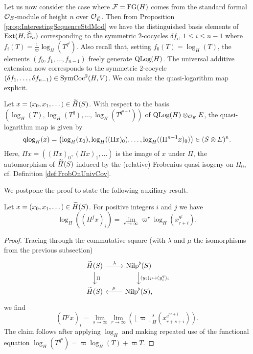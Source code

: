 \documentclass[../main.tex]{subfiles}
\begin{document}
Let us now consider the case where $\cF = \FGG(H)$ comes from the standard
formal $\cO_E$-module of height $n$ over $\cO_{\breve E}$. Then 
from Proposition \ref{prop:InterestingSequenceStdMod} we have the distinguished
basis elements of $\Ext(H,\Ghat_a)$ corresponding to the symmetric $2$-cocycles
$\delta f_i$, $1 \leq i \leq n-1$ where $f_i(T) = \frac 1 \varpi
\log_H(T^{q^i})$. Also recall that, setting $f_0(T) = \log_H(T)$, the elements 
$(f_0, f_1, \dots, f_{n-1})$ freely generate $\QLog(H)$. The universal
additive extension now corresponds to the symmetric $2$-cocycle $(\delta f_1,
\dots, \delta f_{n-1}) \in \SymCoc^2(H,V)$.
We can make the quasi-logarithm map explicit.

\begin{prop}\label{prop:qlogmapExplicit}
  Let $x = (x_0, x_1, \dots) \in \Tilde H(S)$. With respect to the basis
  $(\log_H(T),\allowbreak \log_H(T^q), \allowbreak \dots, \allowbreak \log_H(T^{q^{n-1}}))$ of 
  $\QLog(H) \otimes_{\cO_E} E$, the quasi-logarithm map is given by
  \begin{equation*}
    \qlog_H(x) = \left(\log_H(x_0), \log_H((\Pi x)_0), \dots, \log_H((\Pi^{n-1}
    x)_0)\right) \in (S\otimes E)^n.
  \end{equation*}
  Here, $\Pi x = ((\Pi x)_0, (\Pi x)_1, \dots)$ is the image of $x$ under
  $\Pi$, the automorphism of $\Tilde
  H(S)$ induced by the (relative) Frobenius quasi-isogeny on $H_0$, cf. Definition
  \ref{def:FrobOnUnivCov}.
\end{prop}
We postpone the proof to state the following auxiliary result.
\begin{lem}\label{lem:FrobOnTildeHExpl}
  Let $x = (x_0 ,x_1, \dots) \in \Tilde H(S)$. For positive integers $i$ and
  $j$ we have
  \begin{equation*}
    \log_H((\Pi^j x)_i) = \lim_{r \to \infty} \varpi^r \log_H(x_{r+i}^{q^j}).
  \end{equation*}
\begin{proof}
  Tracing through the commutative square (with $\lambda$ and $\mu$ the
  isomorphisms from the previous subsection)
    \begin{equation*}
    \begin{tikzcd}[ampersand replacement=\&]
    	{\Tilde H(S)} \& {\Nilp^\flat(S)} \\
    	{\Tilde H(S)} \& {\Nilp^\flat(S),}
    	\arrow["\lambda", from=1-1, to=1-2]
    	\arrow["\Pi", from=1-1, to=2-1]
    	\arrow["{(y_i)_i \mapsto (y_i^{q})_i}", from=1-2, to=2-2]
    	\arrow["\mu"', from=2-2, to=2-1]
    \end{tikzcd}
    \end{equation*}
    we find 
    \begin{equation} \label{eq:CompsOfPiExplicit}
      (\Pi^j x)_i = \lim_{s \to \infty} \lim_{r\to\infty} \left([\varpi]_H^s
      (x_{r+s+i}^{q^{nr + j}})\right).
    \end{equation}
    The claim follows after applying $\log_H$ and making repeated use of the
    functional equation $\log_H(T^{q^n}) = \varpi \log_H(T) + \varpi T$.
\end{proof}
\end{lem}
\end{document}
